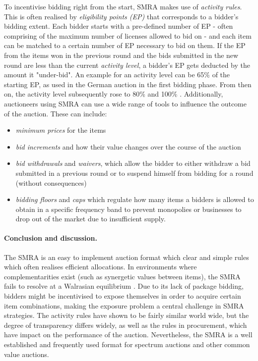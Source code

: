 To incentivise bidding right from the start, SMRA makes use of \textit{activity rules}. This is often realised by \textit{eligibility points (EP)} that corresponds to a bidder's bidding extent. Each bidder starts with a pre-defined number of EP - often comprising of the maximum number of licenses allowed to bid on - and each item can be matched to a certain number of EP necessary to bid on them. If the EP from the items won in the previous round and the bids submitted in the new round are less than the current \textit{activity level}, a bidder's EP gets deducted by the amount it "under-bid". An example for an activity level can be 65\% of the starting EP, as used in the German auction in the first bidding phase. From then on, the activity level subsequently rose to 80\% and 100\% \cite[p. 15]{Bundesnetzagentur2015}.
Additionally, auctioneers using SMRA can use a wide range of tools to influence the outcome of the auction. These can include:
\begin{itemize}
	\item \textit{minimum prices} for the items
	\item \textit{bid increments} and how their value changes over the course of the auction
	\item \textit{bid withdrawals} and \textit{waivers}, which allow the bidder to either withdraw a bid submitted in a previous round or to suspend himself from bidding for a round (without consequences)
	\item \textit{bidding floors} and \textit{caps} which regulate how many items a bidders is allowed to obtain in a specific frequency band to prevent monopolies or businesses to drop out of the market due to insufficient supply.
\end{itemize}

\paragraph{Conclusion and discussion.}
The SMRA is an easy to implement auction format which clear and simple rules which often realises efficient allocations. In environments where complementarities exist (such as synergetic values between items), the SMRA fails to resolve at a Walrasian equilibrium \cite{BichlerLecture2016}. Due to its lack of package bidding, bidders might be incentivised to expose themselves in order to acquire certain item combinations, making the exposure problem a central challenge in SMRA strategies. The activity rules have shown to be fairly similar world wide, but the degree of transparency differs widely, as well as the rules in procurement, which have impact on the performance of the auction. Nevertheless, the SMRA is a well established and frequently used format for spectrum auctions and other common value auctions. 

